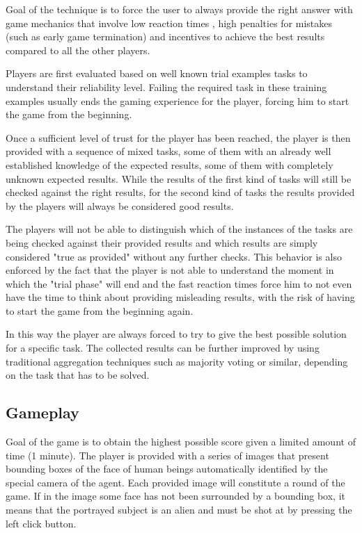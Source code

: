 Goal of the technique is to force the user to always provide the right answer
with game mechanics that involve low reaction times , high penalties for mistakes
(such as early game termination) and incentives to achieve the best results
compared to all the other players.

Players are first evaluated based on well known trial examples tasks to understand
their reliability level. Failing the required task in these training examples
usually ends the gaming experience for the player, forcing him to start the game
from the beginning.

Once a sufficient level of trust for the player has been reached, the player is
then provided with a sequence of mixed tasks, some of them with an already well
established knowledge of the expected results, some of them with completely
unknown expected results. While the results of the first kind of tasks will
still be checked against the right results, for the second kind of tasks the
results provided by the players will always be considered good results.

The players will not be able to distinguish which of the instances of the tasks
are being checked against their provided results and which results are simply
considered "true as provided" without any further checks. This behavior is also
enforced by the fact that the player is not able to understand the moment in which
the "trial phase" will end and the fast reaction times force him to not even have
the time to think about providing misleading results, with the risk of having to
start the game from the beginning again.

In this way the player are always forced to try to give the best possible solution
for a specific task. The collected results can be further improved by using
traditional aggregation techniques such as majority voting or similar, depending
on the task that has to be solved.

\subsection{Gameplay}\label{case:hybrid:gameplay}
Goal of the game is to obtain the highest possible score given a limited amount
of time (1 minute). The player is provided with a series of images that present
bounding boxes of the face of human beings automatically identified by the special
camera of the agent. Each provided image will constitute a round of the game. If
in the image some face has not been surrounded by a bounding box, it means that
the portrayed subject is an alien and must be shot at by pressing the left click
button.

